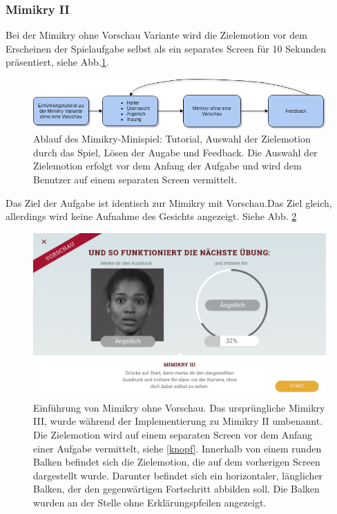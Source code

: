 \subsubsection{Mimikry II}
Bei der Mimikry ohne Vorschau Variante wird die Zielemotion vor dem Erscheinen der Spielaufgabe selbst als ein separates Screen für 10 Sekunden präsentiert, siehe Abb.\ref{ohne_diagramm}.
\begin{figure}[!ht]
\centering\includegraphics[width=360pt]{texes/implementierung_mimikry_no_preview.png}
\caption{Ablauf des Mimikry-Minispiel: Tutorial, Auswahl der Zielemotion durch das Spiel, Lösen der Augabe und Feedback. Die Auswahl der Zielemotion erfolgt vor dem Anfang der Aufgabe und wird dem Benutzer auf einem separaten Screen vermittelt.}
\label{ohne_diagramm}
\end{figure}
Das Ziel der Aufgabe ist identisch zur Mimikry mit Vorschau.Das Ziel gleich, allerdings wird keine Aufnahme des Gesichts angezeigt. Siehe Abb. \ref{ohne}
\begin{figure}[!ht]
\centering\includegraphics[width=330pt]{res/TASK_MIMIKRY_III_INTRO.png}
\caption{Einführung von Mimikry ohne Vorschau. Das ursprüngliche Mimikry III, wurde während der Implementierung zu Mimikry II umbenannt. 
Die Zielemotion wird auf einem separaten Screen vor dem Anfang einer Aufgabe vermittelt, siehe \ref{knopf}. 
Innerhalb von einem runden Balken befindet sich die Zielemotion, die auf dem vorherigen Screen dargestellt wurde. Darunter befindet sich ein horizontaler, länglicher Balken, der den gegenwärtigen Fortschritt abbilden soll. Die Balken wurden an der Stelle ohne Erklärungspfeilen angezeigt.}
\label{ohne}
\end{figure}
